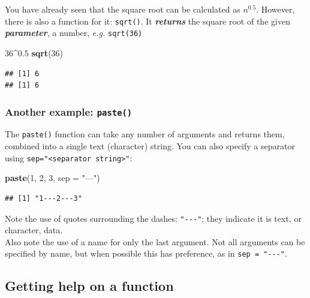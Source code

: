 \documentclass[]{book}
\newenvironment{Shaded}{\begin{snugshade}}{\end{snugshade}}
\newcommand{\DataTypeTok}[1]{\textcolor[rgb]{0.13,0.29,0.53}{#1}}
\newcommand{\DecValTok}[1]{\textcolor[rgb]{0.00,0.00,0.81}{#1}}
\newcommand{\FloatTok}[1]{\textcolor[rgb]{0.00,0.00,0.81}{#1}}
\newcommand{\KeywordTok}[1]{\textcolor[rgb]{0.13,0.29,0.53}{\textbf{#1}}}
\newcommand{\NormalTok}[1]{#1}
\newcommand{\OperatorTok}[1]{\textcolor[rgb]{0.81,0.36,0.00}{\textbf{#1}}}
\newcommand{\StringTok}[1]{\textcolor[rgb]{0.31,0.60,0.02}{#1}}
\begin{document}
You have already seen that the square root can be calculated as \(n^{0.5}\).
However, there is also a function for it: \texttt{sqrt()}. It \textbf{\emph{returns}} the square root of the given \textbf{\emph{parameter}}, a number, \emph{e.g.} \texttt{sqrt(36)}

\begin{Shaded}
\begin{Highlighting}[]
\DecValTok{36}\OperatorTok{^}\FloatTok{0.5}
\KeywordTok{sqrt}\NormalTok{(}\DecValTok{36}\NormalTok{)}
\end{Highlighting}
\end{Shaded}

\begin{verbatim}
## [1] 6
## [1] 6
\end{verbatim}

\hypertarget{another-example-paste}{%
\subsubsection*{\texorpdfstring{Another example: \texttt{paste()}}{Another example: paste()}}\label{another-example-paste}}

The \texttt{paste()} function can take any number of arguments and returns them, combined into a single text (character) string. You can also specify a separator using \texttt{sep="\textless{}separator\ string\textgreater{}"}:

\begin{Shaded}
\begin{Highlighting}[]
\KeywordTok{paste}\NormalTok{(}\DecValTok{1}\NormalTok{, }\DecValTok{2}\NormalTok{, }\DecValTok{3}\NormalTok{, }\DataTypeTok{sep =} \StringTok{"---"}\NormalTok{)}
\end{Highlighting}
\end{Shaded}

\begin{verbatim}
## [1] "1---2---3"
\end{verbatim}

Note the use of quotes surrounding the dashes: \texttt{"-\/-\/-"}; they indicate it is text, or character, data.\\
Also note the use of a name for only the last argument. Not all arguments can be specified by name, but when possible this has preference, as in \texttt{sep\ =\ "-\/-\/-"}.

\hypertarget{getting-help-on-a-function}{%
\subsection{Getting help on a function}\label{getting-help-on-a-function}}
\end{document}
